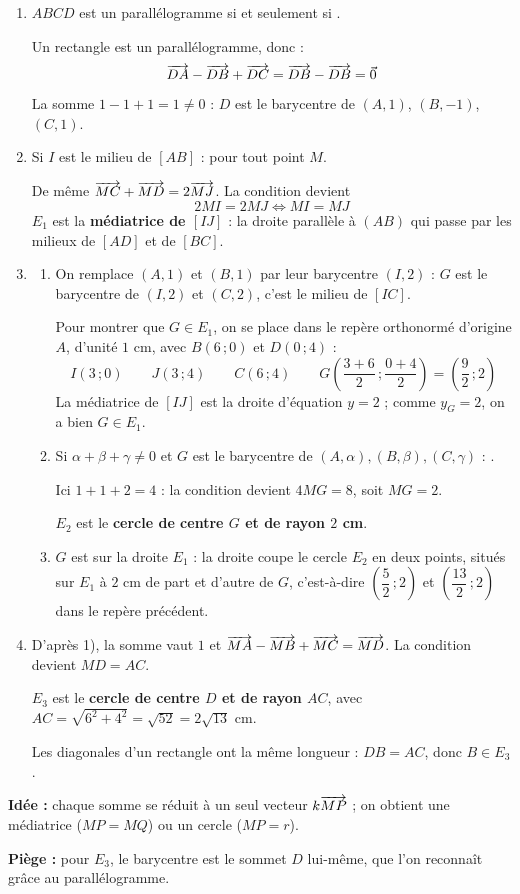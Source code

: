 \begin{enumerate}[itemsep=14pt]
  \item
  \begin{prop}[Parallélogramme]
  $ABCD$ est un parallélogramme si et seulement si .
  \end{prop}
  Un rectangle est un parallélogramme, donc :
  \[\overrightarrow{DA}-\overrightarrow{DB}+\overrightarrow{DC}=\overrightarrow{DB}-\overrightarrow{DB}=\vec0\]
  La somme $1-1+1=1\neq0$ : $D$ est le barycentre de $(A,1)$, $(B,-1)$, $(C,1)$.

  \item
  \begin{prop}[Milieu]
  Si $I$ est le milieu de $[AB]$ :  pour tout point $M$.
  \end{prop}
  De même $\overrightarrow{MC}+\overrightarrow{MD}=2\overrightarrow{MJ}$. La condition devient
  \[2MI=2MJ\iff MI=MJ\]
  $E_1$ est la \textbf{médiatrice de $[IJ]$} : la droite parallèle à $(AB)$ qui passe par les milieux de $[AD]$ et de $[BC]$.

  \item
  \begin{enumerate}[itemsep=10pt]
    \item On remplace $(A,1)$ et $(B,1)$ par leur barycentre $(I,2)$ : $G$ est le barycentre de $(I,2)$ et $(C,2)$, c'est le milieu de $[IC]$.

    Pour montrer que $G\in E_1$, on se place dans le repère orthonormé d'origine $A$, d'unité $1$ cm, avec $B(6\,;0)$ et $D(0\,;4)$ :
    \[I(3\,;0)\qquad J(3\,;4)\qquad C(6\,;4)\qquad G\left(\dfrac{3+6}{2}\,;\dfrac{0+4}{2}\right)=\left(\dfrac92\,;2\right)\]
    La médiatrice de $[IJ]$ est la droite d'équation $y=2$ ; comme $y_G=2$, on a bien $G\in E_1$.

    \item
    \begin{prop}
    Si $\alpha+\beta+\gamma\neq0$ et $G$ est le barycentre de $(A,\alpha),(B,\beta),(C,\gamma)$ :
    .
    \end{prop}
    Ici $1+1+2=4$ : la condition devient $4MG=8$, soit $MG=2$.

    $E_2$ est le \textbf{cercle de centre $G$ et de rayon $2$ cm}.

    \item $G$ est sur la droite $E_1$ : la droite coupe le cercle $E_2$ en deux points, situés sur $E_1$ à $2$ cm de part et d'autre de $G$, c'est-à-dire $\left(\dfrac52\,;2\right)$ et $\left(\dfrac{13}{2}\,;2\right)$ dans le repère précédent.
  \end{enumerate}

  \item D'après 1), la somme vaut $1$ et $\overrightarrow{MA}-\overrightarrow{MB}+\overrightarrow{MC}=\overrightarrow{MD}$. La condition devient $MD=AC$.

  $E_3$ est le \textbf{cercle de centre $D$ et de rayon $AC$}, avec $AC=\sqrt{6^2+4^2}=\sqrt{52}=2\sqrt{13}$ cm.

  Les diagonales d'un rectangle ont la même longueur : $DB=AC$, donc $B\in E_3$.
\end{enumerate}
\textbf{Idée :} chaque somme se réduit à un seul vecteur $k\overrightarrow{MP}$ ; on obtient une médiatrice ($MP=MQ$) ou un cercle ($MP=r$).

\textbf{Piège :} pour $E_3$, le barycentre est le sommet $D$ lui-même, que l'on reconnaît grâce au parallélogramme.
